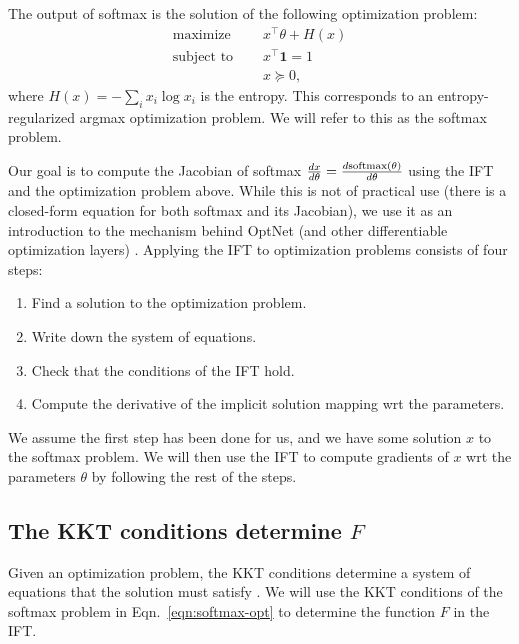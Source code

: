 \documentclass[11pt]{article}
\begin{document}
The output of softmax is the solution of the following optimization problem:
\begin{equation}
\label{eqn:softmax-opt}
\begin{aligned}
\textrm{maximize } \quad & x^\top\theta + H(x)\\
\textrm{subject to } \quad & x^\top \mathbf{1} = 1\\
& x \succeq 0,
\end{aligned}
\end{equation}
where $H(x) = -\sum_i x_i \log x_i$ is the entropy.
This corresponds to an entropy-regularized argmax optimization problem.
We will refer to this as the softmax problem.

Our goal is to compute the Jacobian of softmax
$\frac{dx}{d\theta} = \frac{d\mathrm{softmax}(\theta)}{d\theta}$
using the IFT and the optimization problem above.
While this is not of practical use (there is a closed-form equation
for both softmax and its Jacobian),
we use it as an introduction to the mechanism
behind OptNet (and other differentiable optimization layers)
\citep{optnet,agrawal2019diffcvx}.
Applying the IFT to optimization problems consists of four steps:
\begin{enumerate}
\item Find a solution to the optimization problem.
\item Write down the system of equations.
\item Check that the conditions of the IFT hold.
\item Compute the derivative of the implicit solution mapping wrt the parameters.
\end{enumerate}

We assume the first step has been done for us,
and we have some solution $x$ to the softmax problem.
We will then use the IFT to compute gradients of $x$ wrt the parameters $\theta$
by following the rest of the steps.

\subsection{The KKT conditions determine $F$}
Given an optimization problem, the KKT conditions determine a system of equations
that the solution must satisfy \citep{kkt-thesis,kkt}.
We will use the KKT conditions of the softmax problem in
Eqn.~\ref{eqn:softmax-opt} to determine the function $F$ in the IFT.
\end{document}
